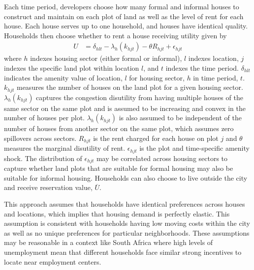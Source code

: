 \documentclass[12pt]{article}
\begin{document}
Each time period, developers choose how many formal and informal houses to construct and maintain on each plot of land as well as the level of rent for each house.  Each house serves up to one household, and houses have identical quality.  Households then choose whether to rent a house receiving utility given by
\begin{align*}
U &= \delta_{hlt} - \lambda_{h}(k_{hjt}) - \theta R_{hjt}   + \epsilon_{hjt}  
\end{align*}
\noindent where $h$ indexes housing sector (either formal or informal), $l$ indexes location, $j$ indexes the specific land plot within location $l$, and $t$ indexes the time period.  $\delta_{hlt}$ indicates the amenity value of location, $l$ for housing sector, $h$ in time period, $t$.  $k_{hjt}$ measures the number of houses on the land plot for a given housing sector.  $\lambda_{h}(k_{hjt})$ captures the congestion disutility from having multiple houses of the same sector on the same plot and is assumed to be increasing and convex in the number of houses per plot.   $\lambda_{h}(k_{hjt})$ is also assumed to be independent of the number of houses from another sector on the same plot, which assumes zero spillovers across sectors.    $R_{hjt}$ is the rent charged for each house on plot $j$ and $\theta$ measures the marginal disutility of rent.  $\epsilon_{hjt}$ is the plot and time-specific amenity shock.  The distribution of $\epsilon_{hjt}$ may be correlated across housing sectors to capture whether land plots that are suitable for formal housing may also be suitable for informal housing.  Households can also choose to live outside the city and receive reservation value, $\overline{U}$.  

This approach assumes that households have identical preferences across houses and locations, which implies that housing demand is perfectly elastic.  This assumption is consistent with households having low moving costs within the city as well as no unique preferences for particular neighborhoods.  These assumptions may be reasonable in a context like South Africa where high levels of unemployment mean that different households face similar strong incentives to locate near employment centers.
 
\end{document}
